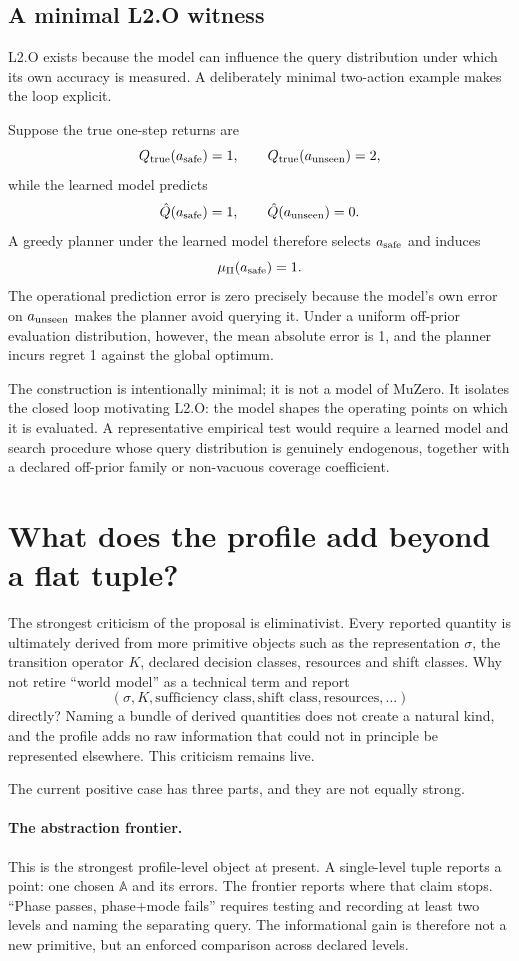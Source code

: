 \documentclass[10pt]{article}
\newcommand{\Aabs}{\mathbb A}
\begin{document}
\subsection{A minimal L2.O witness}

L2.O exists because the model can influence the query distribution under which its own accuracy is measured. A deliberately minimal two-action example makes the loop explicit.

Suppose the true one-step returns are
\[
Q_{\rm true}(a_{\rm safe})=1,
\qquad
Q_{\rm true}(a_{\rm unseen})=2,
\]
while the learned model predicts
\[
\hat Q(a_{\rm safe})=1,
\qquad
\hat Q(a_{\rm unseen})=0.
\]
A greedy planner under the learned model therefore selects $a_{\rm safe}$ and induces
\[
\mu_\Pi(a_{\rm safe})=1.
\]
The operational prediction error is zero precisely because the model's own error on $a_{\rm unseen}$ makes the planner avoid querying it. Under a uniform off-prior evaluation distribution, however, the mean absolute error is 1, and the planner incurs regret 1 against the global optimum.

The construction is intentionally minimal; it is not a model of MuZero. It isolates the closed loop motivating L2.O: the model shapes the operating points on which it is evaluated. A representative empirical test would require a learned model and search procedure whose query distribution is genuinely endogenous, together with a declared off-prior family or non-vacuous coverage coefficient.

\section{What does the profile add beyond a flat tuple?}

The strongest criticism of the proposal is eliminativist. Every reported quantity is ultimately derived from more primitive objects such as the representation $\sigma$, the transition operator $K$, declared decision classes, resources and shift classes. Why not retire ``world model'' as a technical term and report
\[
(\sigma,K,\text{sufficiency class},\text{shift class},\text{resources},\ldots)
\]
directly? Naming a bundle of derived quantities does not create a natural kind, and the profile adds no raw information that could not in principle be represented elsewhere. This criticism remains live.

The current positive case has three parts, and they are not equally strong.

\paragraph{The abstraction frontier.}
This is the strongest profile-level object at present. A single-level tuple reports a point: one chosen $\Aabs$ and its errors. The frontier reports where that claim stops. ``Phase passes, phase+mode fails'' requires testing and recording at least two levels and naming the separating query. The informational gain is therefore not a new primitive, but an enforced comparison across declared levels.
\end{document}

